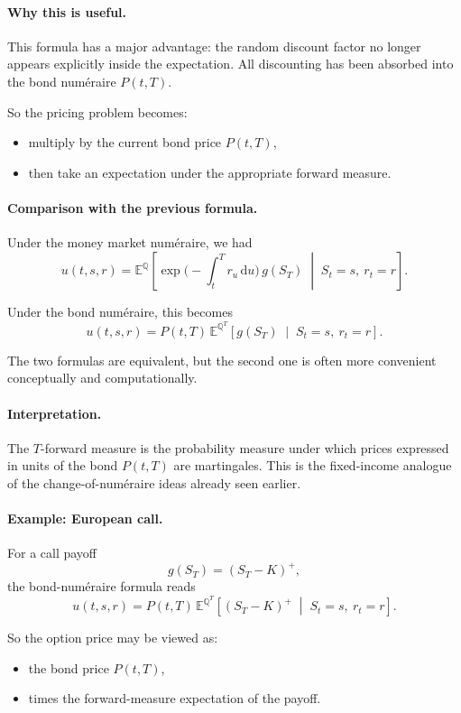 \documentclass[11pt]{article}
\newcommand{\Qbb}{\mathbb{Q}}
\newcommand{\E}{\mathbb{E}}
\theoremstyle{plain}
\theoremstyle{definition}
\theoremstyle{remark}
\begin{document}
\paragraph{Why this is useful.}
This formula has a major advantage:
the random discount factor no longer appears explicitly inside the
expectation.
All discounting has been absorbed into the bond numéraire \(P(t,T)\).

So the pricing problem becomes:
\begin{itemize}[leftmargin=1.4em]
    \item multiply by the current bond price \(P(t,T)\),
    \item then take an expectation under the appropriate forward
    measure.
\end{itemize}

\paragraph{Comparison with the previous formula.}
Under the money market numéraire, we had
\[
u(t,s,r)
=
\E^\Qbb\!\left[
\exp\!\Big(-\int_t^T r_u\,\mathrm{d}u\Big)\,g(S_T)
\;\middle|\;
S_t=s,\ r_t=r
\right].
\]

Under the bond numéraire, this becomes
\[
u(t,s,r)
=
P(t,T)\,
\E^{\Qbb^T}\!\left[
g(S_T)
\;\middle|\;
S_t=s,\ r_t=r
\right].
\]

The two formulas are equivalent, but the second one is often more
convenient conceptually and computationally.

\paragraph{Interpretation.}
The \(T\)-forward measure is the probability measure under which prices
expressed in units of the bond \(P(t,T)\) are martingales.
This is the fixed-income analogue of the change-of-numéraire ideas
already seen earlier.

\paragraph{Example: European call.}
For a call payoff
\[
g(S_T)=(S_T-K)^+,
\]
the bond-numéraire formula reads
\[
\boxed{
u(t,s,r)
=
P(t,T)\,
\E^{\Qbb^T}\!\left[
(S_T-K)^+
\;\middle|\;
S_t=s,\ r_t=r
\right].
}
\]

So the option price may be viewed as:
\begin{itemize}[leftmargin=1.4em]
    \item the bond price \(P(t,T)\),
    \item times the forward-measure expectation of the payoff.
\end{itemize}
\end{document}

